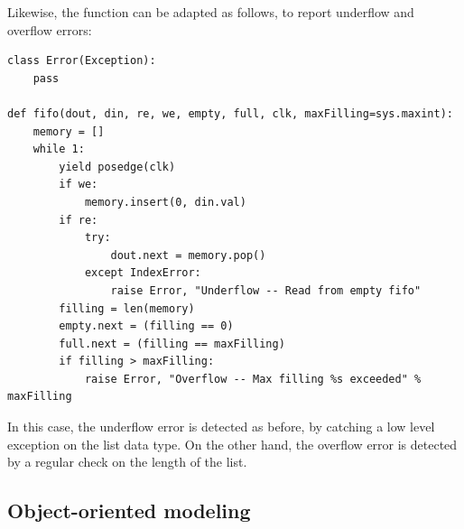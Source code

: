 Likewise, the  function can be adapted as follows, to
report underflow and overflow errors:

\begin{verbatim}
class Error(Exception):
    pass

def fifo(dout, din, re, we, empty, full, clk, maxFilling=sys.maxint):
    memory = []
    while 1:
        yield posedge(clk)
        if we:
            memory.insert(0, din.val)
        if re:
            try:
                dout.next = memory.pop()
            except IndexError:
                raise Error, "Underflow -- Read from empty fifo"
        filling = len(memory)
        empty.next = (filling == 0)
        full.next = (filling == maxFilling)
        if filling > maxFilling:
            raise Error, "Overflow -- Max filling %s exceeded" % maxFilling
\end{verbatim}

In this case, the underflow error is detected as before, by catching a
low level exception on the list data type. On the other hand, the
overflow error is detected by a regular check on the length of the
list.


\subsection{Object-oriented modeling \label{model-obj}}
